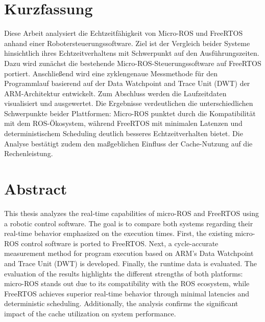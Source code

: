 \section*{Kurzfassung}

Diese Arbeit analysiert die Echtzeitfähigkeit von Micro-ROS und FreeRTOS anhand
einer Robotersteuerungssoftware. Ziel ist der Vergleich beider Systeme
hinsichtlich ihres Echtzeitverhaltens mit Schwerpunkt auf den Ausführungszeiten.
Dazu wird zunächst die bestehende Micro-ROS-Steuerungssoftware auf FreeRTOS
portiert. Anschließend wird eine zyklengenaue Messmethode für den Programmlauf
basierend auf der Data Watchpoint and Trace Unit (DWT) der ARM-Architektur
entwickelt. Zum Abschluss werden die Laufzeitdaten visualisiert und ausgewertet.
Die Ergebnisse verdeutlichen die unterschiedlichen Schwerpunkte beider
Plattformen: Micro-ROS punktet durch die Kompatibilität mit dem ROS-Ökosystem,
während FreeRTOS mit minimalen Latenzen und deterministischem Scheduling
deutlich besseres Echtzeitverhalten bietet. Die Analyse bestätigt zudem den
maßgeblichen Einfluss der Cache-Nutzung auf die Rechenleistung.

\section*{Abstract}

This thesis analyzes the real-time capabilities of micro-ROS and FreeRTOS using
a robotic control software. The goal is to compare both systems regarding their
real-time behavior emphasized on the execution times. First, the existing
micro-ROS control software is ported to FreeRTOS. Next, a cycle-accurate
measurement method for program execution based on ARM's Data Watchpoint and
Trace Unit (DWT) is developed. Finally, the runtime data is evaluated. The
evaluation of the results highlights the different strengths of both platforms:
micro-ROS stands out due to its compatibility with the ROS ecosystem, while
FreeRTOS achieves superior real-time behavior through minimal latencies and
deterministic scheduling. Additionally, the analysis confirms the significant
impact of the cache utilization on system performance.
